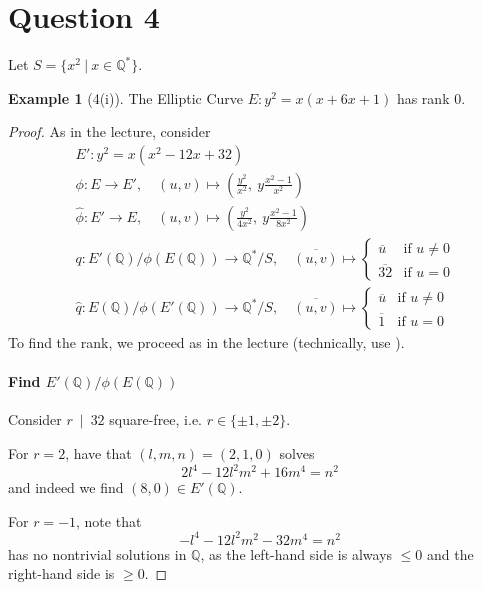 \documentclass{scrartcl}
\newcommand{\Q}{\mathbb{Q}}
\newcommand{\divides}{\ \mid \ }
\theoremstyle{definition}
\newtheorem{example}[subsection]{Example}
\begin{document}
\section{Question 4}
Let $S = \{ x^2 \ | \ x \in \Q^* \}$.
\begin{example}[4(i)]
    \label{ex:4i}
    The Elliptic Curve $E: y^2 = x(x + 6x + 1)$ has rank $0$.
\end{example}
\begin{proof}
    As in the lecture, consider
    \begin{align*}
        &E': y^2 = x(x^2 - 12x + 32) \\
        &\phi: E \to E', \quad (u, v) \mapsto \left( \frac {y^2} {x^2}, \ y \frac {x^2 - 1} {x^2} \right) \\
        &\hat{\phi}: E' \to E, \quad (u, v) \mapsto \left( \frac {y^2} {4x^2}, \ y \frac {x^2 - 1} {8x^2} \right) \\
        &q: E'(\Q)/\phi(E(\Q)) \to \Q^*/S, \quad \overline{(u, v)} \mapsto \begin{cases}
            \overline{u} & \text{if $u \neq 0$} \\
            \overline{32} & \text{if $u = 0$}
        \end{cases} \\
        &\hat{q}: E(\Q)/\phi(E'(\Q)) \to \Q^*/S, \quad \overline{(u, v)} \mapsto \begin{cases}
            \overline{u} & \text{if $u \neq 0$} \\
            \overline{1} & \text{if $u = 0$}
        \end{cases}
    \end{align*}
    To find the rank, we proceed as in the lecture (technically, use \cite[Lemma 6.6]{lecture}).

    \paragraph{Find $E'(\Q)/\phi(E(\Q))$} Consider $r \divides 32$ square-free, i.e. $r \in \{ \pm 1, \pm 2 \}$.

    For $r = 2$, have that $(l, m, n) = (2, 1, 0)$ solves
    \begin{equation*}
        2l^4 - 12l^2m^2 + 16m^4 = n^2
    \end{equation*}
    and indeed we find $(8, 0) \in E'(\Q)$.

    For $r = -1$, note that
    \begin{equation*}
        -l^4 - 12l^2m^2 - 32m^4 = n^2
    \end{equation*}
    has no nontrivial solutions in $\Q$, as the left-hand side is always $\leq 0$ and the right-hand side is $\geq 0$.


\end{proof}
\end{document}
